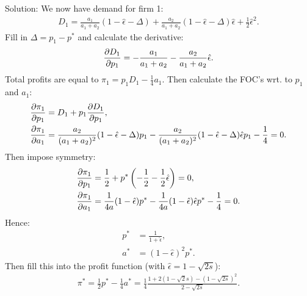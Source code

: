 \begin{enumerate}
	      Solution: We now have demand for firm 1:
	      \begin{align*}
		      D_1=\frac{a_1}{a_1+a_2}(1-\hat\epsilon-\Delta)
		      +\frac{a_2}{a_1+a_2}(1-\hat\epsilon-\Delta)\hat\epsilon
		      +\frac{1}{2}\hat\epsilon^2.
	      \end{align*}
	      Fill in $\Delta=p_1-p^*$ and calculate the derivative:
	      \begin{align*}
		      \frac{\partial D_1}{\partial p_1}=-\frac{a_1}{a_1+a_2}-\frac{a_2}{a_1+a_2}\hat\epsilon.
	      \end{align*}
	      Total profits are equal to $\pi_1=p_1D_1-\frac{1}{4}a_1$. Then
	      calculate the FOC's wrt. to $p_1$ and $a_1$:
	      \begin{align*}
		      \frac{\partial \pi_1}{\partial p_1} & =D_1+p_1\frac{\partial D_1}{\partial p_1},                            \\
		      \frac{\partial \pi_1}{\partial a_1} & =\frac{a_2}{(a_1+a_2)^2}(1-\hat\epsilon-\Delta)p_1-
		      \frac{a_2}{(a_1+a_2)^2}(1-\hat\epsilon-\Delta)\hat\epsilon p_1-\frac{1}{4}=0.
	      \end{align*}
	      Then impose symmetry:
	      \begin{align*}
		      \frac{\partial \pi_1}{\partial p_1} & =\frac{1}{2}+p^*\left(-\frac{1}{2}-\frac{1}{2}\hat\epsilon\right)=0, \\
		      \frac{\partial \pi_1}{\partial a_1} & =\frac{1}{4a}(1-\hat\epsilon)p^*
		      -\frac{1}{4a}(1-\hat\epsilon)\hat\epsilon p^*-\frac{1}{4}=0.
	      \end{align*}
	      Hence:
	      \begin{align*}
		      p^* & =\frac{1}{1+\hat\epsilon}, \\
		      a^* & =(1-\hat\epsilon)^2p^*.
	      \end{align*}
	      Then fill this into the profit function (with $\hat\epsilon=1-\sqrt{2s}$):
	      \begin{align*}
		      \pi^*=\frac{1}{2}p^*-\frac{1}{4}a^*=\frac{1}{4}\frac{1+2(1-\sqrt2s)-(1-\sqrt{2s})^2}
		      {2-\sqrt{2s}}.
	      \end{align*}
\end{enumerate}
